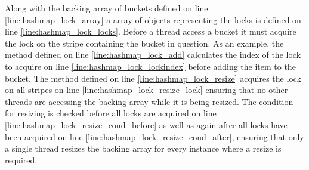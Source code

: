 Along with the backing array of buckets defined on line \ref{line:hashmap_lock_array} a array of objects representing the locks is defined on line \ref{line:hashmap_lock_locks}. Before a thread access a bucket it must acquire the lock on the stripe containing the bucket in question. As an example, the  method defined on line \ref{line:hashmap_lock_add} calculates the index of the lock to acquire on line \ref{line:hashmap_lock_lockindex} before adding the item to the bucket. The  method defined on line \ref{line:hashmap_lock_resize} acquires the lock on all stripes on line \ref{line:hashmap_lock_resize_lock} ensuring that no other threads are accessing the backing array while it is being resized. The condition for resizing is checked before all locks are acquired on line \ref{line:hashmap_lock_resize_cond_before} as well as again after all locks have been acquired on line \ref{line:hashmap_lock_resize_cond_after}, ensuring that only a single thread resizes the backing array for every instance where a resize is required.

